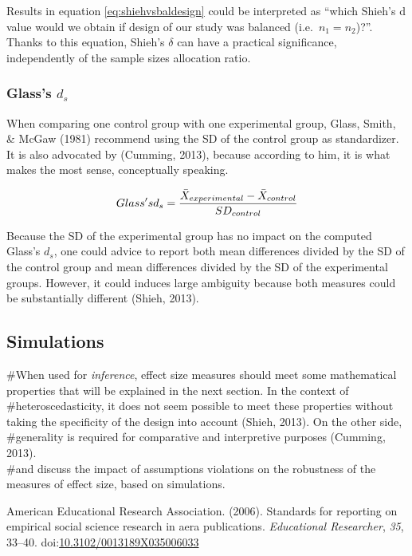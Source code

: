 \documentclass[man]{apa6}
\begin{document}
Results in equation \ref{eq:shiehvsbaldesign} could be interpreted as \enquote{which Shieh's d value would we obtain if design of our study was balanced (i.e.~\(n_{1} = n_{2}\))?}. Thanks to this equation, Shieh's \(\delta\) can have a practical significance, independently of the sample sizes allocation ratio.

\hypertarget{glasss-d_s}{%
\subsubsection{\texorpdfstring{Glass's \(d_s\)}{Glass's d\_s}}\label{glasss-d_s}}

When comparing one control group with one experimental group, Glass, Smith, \& McGaw (1981) recommend using the SD of the control group as standardizer. It is also advocated by (Cumming, 2013), because according to him, it is what makes the most sense, conceptually speaking.

\begin{equation} 
Glass's \space d_s = \frac{\bar{X}_{experimental} - \bar{X}_{control}}{SD_{control}}
\label{eq:Glassds}
\end{equation}

Because the SD of the experimental group has no impact on the computed Glass's \(d_s\), one could advice to report both mean differences divided by the SD of the control group and mean differences divided by the SD of the experimental groups. However, it could induces large ambiguity because both measures could be substantially different (Shieh, 2013).

\hypertarget{simulations}{%
\subsection{Simulations}\label{simulations}}

\#When used for \emph{inference}, effect size measures should meet some mathematical properties that will be explained in the next section. In the context of \#heteroscedasticity, it does not seem possible to meet these properties without taking the specificity of the design into account (Shieh, 2013). On the other side, \#generality is required for comparative and interpretive purposes (Cumming, 2013).\\
\#and discuss the impact of assumptions violations on the robustness of the measures of effect size, based on simulations.

\hypertarget{refs}{}
\leavevmode\hypertarget{ref-AERA_2006}{}%
American Educational Research Association. (2006). Standards for reporting on empirical social science research in aera publications. \emph{Educational Researcher}, \emph{35}, 33--40. doi:\href{https://doi.org/10.3102/0013189X035006033}{10.3102/0013189X035006033}
\end{document}
